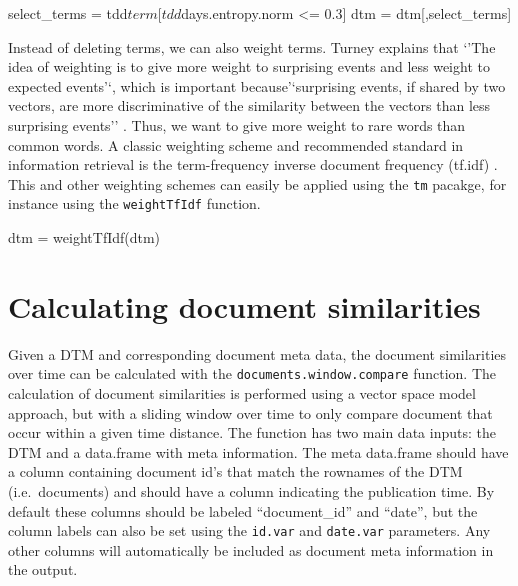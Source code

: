 \begin{Schunk}
\begin{Sinput}
select_terms = tdd$term[tdd$days.entropy.norm <= 0.3]
dtm = dtm[,select_terms]
\end{Sinput}
\end{Schunk}

Instead of deleting terms, we can also weight terms. Turney explains
that `'The idea of weighting is to give more weight to surprising events
and less weight to expected events'`, which is important
because'`surprising events, if shared by two vectors, are more
discriminative of the similarity between the vectors than less
surprising events'' \citep[156]{turney02}. Thus, we want to give more
weight to rare words than common words. A classic weighting scheme and
recommended standard in information retrieval is the term-frequency
inverse document frequency (tf.idf) \citep[\citet{monroe08}]{sparck72}.
This and other weighting schemes can easily be applied using the
\texttt{tm} pacakge, for instance using the \texttt{weightTfIdf}
function.

\begin{Schunk}
\begin{Sinput}
dtm = weightTfIdf(dtm)
\end{Sinput}
\end{Schunk}

\section{Calculating document similarities}

Given a DTM and corresponding document meta data, the document
similarities over time can be calculated with the
\texttt{documents.window.compare} function. The calculation of document
similarities is performed using a vector space model
\citep{salton75, salton03} approach, but with a sliding window over time
to only compare document that occur within a given time distance. The
function has two main data inputs: the DTM and a data.frame with meta
information. The meta data.frame should have a column containing
document id's that match the rownames of the DTM (i.e.~documents) and
should have a column indicating the publication time. By default these
columns should be labeled ``document\_id'' and ``date'', but the column
labels can also be set using the \texttt{id.var} and \texttt{date.var}
parameters. Any other columns will automatically be included as document
meta information in the output.

